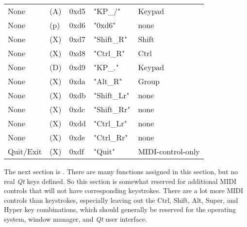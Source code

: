 \begin{table}[htb!]
\begin{tabular}{l l l l l}
        None               & (A)  &  0xd5   & "KP\_/"      & Keypad \\
        None               & (p)  &  0xd6   & "0xd6"       & none \\
        None               & (X)  &  0xd7   & "Shift\_R"   & Shift \\
        None               & (X)  &  0xd8   & "Ctrl\_R"    & Ctrl \\
        None               & (D)  &  0xd9   & "KP\_."      & Keypad \\
        None               & (X)  &  0xda   & "Alt\_R"     & Group \\
        None               & (X)  &  0xdb   & "Shift\_Lr"  & none \\
        None               & (X)  &  0xdc   & "Shift\_Rr"  & none \\
        None               & (X)  &  0xdd   & "Ctrl\_Lr"   & none \\
        None               & (X)  &  0xde   & "Ctrl\_Rr"   & none \\
        Quit/Exit          & (X)  &  0xdf   & "Quit"       & MIDI-control-only \\
      \end{tabular}
   \end{table}

   The next section is .
   There are many functions assigned in this section, but no
   real \textsl{Qt} keys defined.
   So this section is somewhat reserved
   for additional MIDI controls that will not have corresponding keystrokes.
   There are a lot more MIDI controls than keystrokes, especially leaving out
   the Ctrl, Shift, Alt, Super, and Hyper key combinations, which should
   generally be reserved for the operating system, window manager,
   and \textsl{Qt} user interface.

